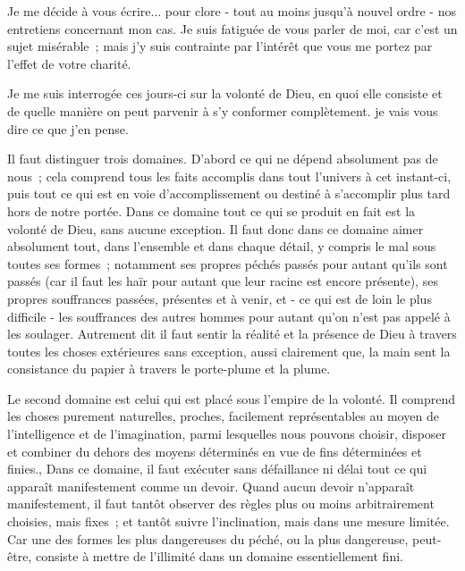 \documentclass[french,twoside]{book} %
\newcommand{\dateline}[1]{\medskip{\RaggedLeft{#1}\par}\bigskip}
\newcommand{\salute}[1]{\bigbreak{#1}\par\medbreak}
\newcommand\chaptercont{} %
\begin{document}
\dateline{19 janvier 1942.}

\salute{Mon cher Père,}

\chaptercont
\noindent Je me décide à vous écrire... pour clore - tout au moins jusqu'à nouvel ordre - nos entretiens concernant mon cas. Je suis fatiguée de vous parler de moi, car c'est un sujet misérable ; mais j'y suis contrainte par l'intérêt que vous me portez par l'effet de votre charité.\par
Je me suis interrogée ces jours-ci sur la volonté de Dieu, en quoi elle consiste et de quelle manière on peut parvenir à s'y conformer complètement. je vais vous dire ce que j'en pense.\par
Il faut distinguer trois domaines. D'abord ce qui ne dépend absolument pas de nous ; cela comprend tous les faits accomplis dans tout l'univers à cet instant-ci, puis tout ce qui est en voie d'accomplissement ou destiné à s'accomplir plus tard hors de notre portée. Dans ce domaine tout ce qui se produit en fait est la volonté de Dieu, sans aucune exception. Il faut donc dans ce domaine aimer absolument tout, dans l'ensemble et dans chaque détail, y compris le mal sous toutes ses formes ; notamment ses propres péchés passés pour autant qu'ils sont passés (car il faut les haïr pour autant que leur racine est encore présente), ses propres souffrances passées, présentes et à venir, et - ce qui est de loin le plus difficile - les souffrances des autres hommes pour autant qu'on n'est pas appelé à les soulager. Autrement dit il faut sentir la réalité et la présence de Dieu à travers toutes les choses extérieures sans exception, aussi clairement que, la main sent la consistance du papier à travers le porte-plume et la plume.\par
Le second domaine est celui qui est placé sous l'empire de la volonté. Il comprend les choses purement naturelles, proches, facilement représentables au moyen de l'intelligence et de l'imagination, parmi lesquelles nous pouvons choisir, disposer et combiner du dehors des moyens déterminés en vue de fins déterminées et finies., Dans ce domaine, il faut exécuter sans défaillance ni délai tout ce qui apparaît manifestement comme un devoir. Quand aucun devoir n'apparaît manifestement, il faut tantôt observer des règles plus ou moins arbitrairement choisies, mais fixes ; et tantôt suivre l'inclination, mais dans une mesure limitée. Car une des formes les plus dangereuses du péché, ou la plus dangereuse, peut-être, consiste à mettre de l'illimité dans un domaine essentiellement fini.\par
\end{document}
